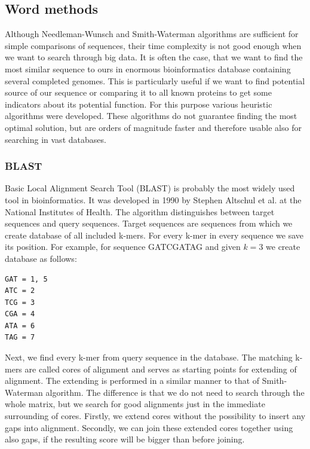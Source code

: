 \subsection{Word methods}
Although Needleman-Wunsch and Smith-Waterman algorithms are sufficient for simple comparisons of sequences, their time complexity is not good enough when we want to search through big data.
It is often the case, that we want to find the most similar sequence to ours in enormous bioinformatics database containing several completed genomes.
This is particularly useful if we want to find potential source of our sequence or comparing it to all known proteins to get some indicators about its potential function.
For this purpose various heuristic algorithms were developed.
These algorithms do not guarantee finding the most optimal solution, but are orders of magnitude faster and therefore usable also for searching in vast databases.
  
\subsubsection{BLAST}
Basic Local Alignment Search Tool (BLAST) \cite{blast} is probably the most widely used tool in bioinformatics.
It was developed in 1990 by Stephen Altschul et al. at the National Institutes of Health.
The algorithm distinguishes between target sequences and query sequences.
Target sequences are sequences from which we create database of all included k-mers.
For every k-mer in every sequence we save its position.
For example, for sequence GATCGATAG and given $k=3$ we create database as follows:
\begin{verbatim}
GAT = 1, 5
ATC = 2
TCG = 3
CGA = 4
ATA = 6
TAG = 7
\end{verbatim}
Next, we find every k-mer from query sequence in the database.
The matching k-mers are called cores of alignment and serves as starting points for extending of alignment.
The extending is performed in a similar manner to that of Smith-Waterman algorithm.
The difference is that we do not need to search through the whole matrix, but we search for good alignments just in the immediate surrounding of cores.
Firstly, we extend cores without the possibility to insert any gaps into alignment.
Secondly, we can join these extended cores together using also gaps, if the resulting score will be bigger than before joining. 
 
